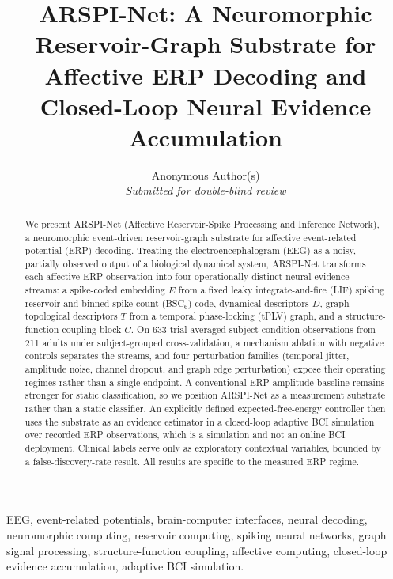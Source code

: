 \documentclass[journal]{IEEEtran}
\begin{document}
\title{ARSPI-Net: A Neuromorphic Reservoir-Graph Substrate for Affective ERP Decoding and Closed-Loop Neural Evidence Accumulation}

\author{Anonymous Author(s)\\\textit{Submitted for double-blind review}}

\maketitle

\begin{abstract}
We present ARSPI-Net (Affective Reservoir-Spike Processing and Inference Network), a neuromorphic event-driven reservoir-graph substrate for affective event-related potential (ERP) decoding. Treating the electroencephalogram (EEG) as a noisy, partially observed output of a biological dynamical system, ARSPI-Net transforms each affective ERP observation into four operationally distinct neural evidence streams: a spike-coded embedding $E$ from a fixed leaky integrate-and-fire (LIF) spiking reservoir and binned spike-count (BSC$_6$) code, dynamical descriptors $D$, graph-topological descriptors $T$ from a temporal phase-locking (tPLV) graph, and a structure-function coupling block $C$. On 633 trial-averaged subject-condition observations from 211 adults under subject-grouped cross-validation, a mechanism ablation with negative controls separates the streams, and four perturbation families (temporal jitter, amplitude noise, channel dropout, and graph edge perturbation) expose their operating regimes rather than a single endpoint. A conventional ERP-amplitude baseline remains stronger for static classification, so we position ARSPI-Net as a measurement substrate rather than a static classifier. An explicitly defined expected-free-energy controller then uses the substrate as an evidence estimator in a closed-loop adaptive BCI simulation over recorded ERP observations, which is a simulation and not an online BCI deployment. Clinical labels serve only as exploratory contextual variables, bounded by a false-discovery-rate result. All results are specific to the measured ERP regime.
\end{abstract}

\begin{IEEEkeywords}
EEG, event-related potentials, brain-computer interfaces, neural decoding, neuromorphic computing, reservoir computing, spiking neural networks, graph signal processing, structure-function coupling, affective computing, closed-loop evidence accumulation, adaptive BCI simulation.
\end{IEEEkeywords}
\end{document}
